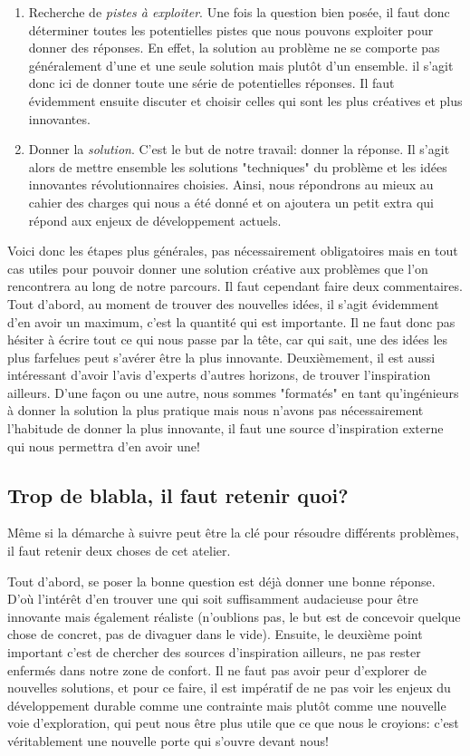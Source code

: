 \begin{enumerate}
\item Recherche de \textit{pistes à exploiter}. Une fois la question bien posée, il faut donc déterminer toutes les potentielles pistes que nous pouvons exploiter pour donner des réponses. En effet, la solution au problème ne se comporte pas généralement d'une et une seule solution mais plutôt d'un ensemble. il s'agit donc ici de donner toute une série de potentielles réponses. Il faut évidemment ensuite discuter et choisir celles qui sont les plus créatives et plus innovantes.

\item Donner la \textit{solution}. C'est le but de notre travail: donner la réponse. Il s'agit alors de mettre ensemble les solutions "techniques" du problème et les idées innovantes révolutionnaires choisies. Ainsi, nous répondrons au mieux au cahier des charges qui nous a été donné et on ajoutera un petit extra qui répond aux enjeux de développement actuels.

\end{enumerate}

Voici donc les étapes plus générales, pas nécessairement obligatoires mais en tout cas utiles pour pouvoir donner une solution créative aux problèmes que l'on rencontrera au long de notre parcours. Il faut cependant faire deux commentaires. Tout d'abord, au moment de trouver des nouvelles idées, il s’agit évidemment d'en avoir un maximum, c'est la quantité qui est importante. Il ne faut donc pas hésiter à écrire tout ce qui nous passe par la tête, car qui sait, une des idées les plus farfelues peut s’avérer être la plus innovante. Deuxièmement, il est aussi intéressant d'avoir l'avis d'experts d'autres horizons, de trouver l'inspiration ailleurs. D'une façon ou une autre, nous sommes "formatés" en tant qu’ingénieurs à donner la solution la plus pratique mais nous n'avons pas nécessairement l'habitude de donner la plus innovante, il faut une source d'inspiration externe qui nous permettra d'en avoir une!


\subsection{Trop de blabla, il faut retenir quoi?}

Même si la démarche à suivre peut être la clé pour résoudre différents problèmes, il faut retenir deux choses de cet atelier. 

Tout d'abord, se poser la bonne question est déjà donner une bonne réponse. D’où l’intérêt d'en trouver une qui soit suffisamment audacieuse pour être innovante mais également réaliste (n'oublions pas, le but est de concevoir quelque chose de concret, pas de divaguer dans le vide). Ensuite, le deuxième point important c'est de chercher des sources d'inspiration ailleurs, ne pas rester enfermés dans notre zone de confort. Il ne faut pas avoir peur d'explorer de nouvelles solutions, et pour ce faire, il est impératif de ne pas voir les enjeux du développement durable comme une contrainte mais plutôt comme une nouvelle voie d'exploration, qui peut nous être plus utile que ce que nous le croyions: c'est véritablement une nouvelle porte qui s'ouvre devant nous!

